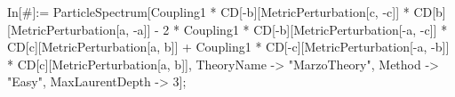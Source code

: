 In[\#]:= ParticleSpectrum[Coupling1 * CD[-b][MetricPerturbation[c, -c]] * CD[b][MetricPerturbation[a, -a]] - 2 * Coupling1 * CD[-b][MetricPerturbation[-a, -c]] * CD[c][MetricPerturbation[a, b]] + Coupling1 * CD[-c][MetricPerturbation[-a, -b]] * CD[c][MetricPerturbation[a, b]], TheoryName -> "MarzoTheory", Method -> "Easy", MaxLaurentDepth -> 3]; 